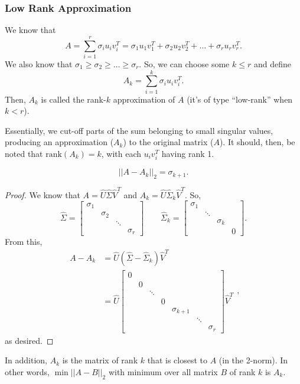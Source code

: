 \documentclass[letterpaper]{article}
\newcommand{\0}{\mathbf{0}}
\begin{document}
\subsubsection{Low Rank Approximation}
We know that \[A = \sum_{i = 1}^{r} \sigma_i u_i v_i^T = \sigma_1 u_1 v_1^T + \sigma_2 u_2 v_2^T + \hdots + \sigma_r u_r v_r^T.\] We also know that $\sigma_1 \geq \sigma_2 \geq \hdots \geq \sigma_r$. So, we can choose some $k \leq r$ and define \[A_k = \sum_{i = 1}^{k} \sigma_i u_i v_i^T.\] Then, $A_k$ is called the rank-$k$ approximation of $A$ (it's of type ``low-rank'' when $k < r$). 

\bigskip 

Essentially, we cut-off parts of the sum belonging to small singular values, producing an approximation ($A_k$) to the original matrix ($A$). It should, then, be noted that $\text{rank}(A_k) = k$, with each $u_i v_i^T$ having rank 1. 

\begin{theorem}{}{}
    \[||A - A_k||_2 = \sigma_{k + 1}.\]
\end{theorem}

\begin{proof}
    We know that $A = \hat{U}\hat{\Sigma}\hat{V}^T$ and $A_k = \hat{U}\hat{\Sigma}_k \hat{V}^T$. So, \[\hat{\Sigma} = \begin{bmatrix}
        \sigma_1 & & &  \\ 
        & \sigma_2 & & \\ 
        & & \ddots & \\ 
        & & & \sigma_r
    \end{bmatrix} \qquad \hat{\Sigma}_k = \begin{bmatrix}
        \sigma_1 & & &  \\ 
        & \ddots & & \\ 
        & & \sigma_k & \\ 
        & & & 0 
    \end{bmatrix}.\]
    From this, \[\begin{aligned}
        A - A_k &= \hat{U}(\hat{\Sigma} - \hat{\Sigma}_k) \hat{V}^T \\ 
            &= \hat{U}\begin{bmatrix}
                0 & & & & & & \\ 
                & 0 & & & & & \\ 
                & & \ddots & & & & \\ 
                & & & 0 & & & \\ 
                & & & & \sigma_{k + 1} & & \\ 
                & & & & & \ddots & \\ 
                & & & & & & \sigma_r
            \end{bmatrix} \hat{V}^T
    \end{aligned},\]
    as desired.
\end{proof}
In addition, $A_k$ is the matrix of rank $k$ that is closest to $A$ (in the 2-norm). In other words, $\min||A - B||_2$ with minimum over all matrix $B$ of rank $k$ is $A_k$. 
\end{document}
